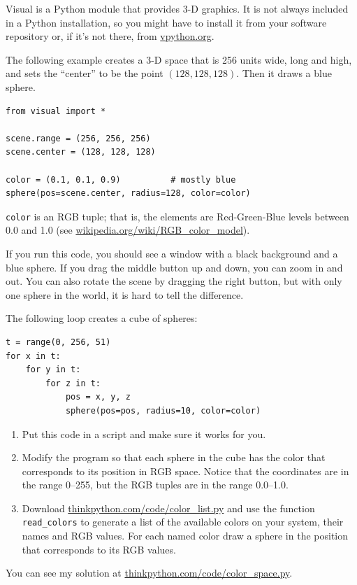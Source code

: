 \documentclass[10pt]{book}
\begin{document}
\begin{ex}


Visual is a Python module that provides 3-D graphics.  It is
not always included in a Python installation, so you might have
to install it from your software repository or, if it's not there,
from \url{vpython.org}.

The following example creates a 3-D space that is 256 units
wide, long and high, and sets the ``center'' to be the
point $(128, 128, 128)$.  Then it draws a blue sphere.

\beforeverb
\begin{verbatim}
from visual import *

scene.range = (256, 256, 256)
scene.center = (128, 128, 128)

color = (0.1, 0.1, 0.9)          # mostly blue
sphere(pos=scene.center, radius=128, color=color)
\end{verbatim}
\afterverb

{\tt color} is an RGB tuple; that is, the elements are Red-Green-Blue
levels between 0.0 and 1.0 (see
\url{wikipedia.org/wiki/RGB_color_model}).

If you run this code, you should see a window with a black
background and a blue sphere.  If you drag the middle button
up and down, you can zoom in and out.  You can also rotate
the scene by dragging the right button, but with only one
sphere in the world, it is hard to tell the difference.

The following loop creates a cube of spheres:

\beforeverb
\begin{verbatim}
t = range(0, 256, 51)
for x in t:
    for y in t:
        for z in t:
            pos = x, y, z
            sphere(pos=pos, radius=10, color=color)
\end{verbatim}
\afterverb

\begin{enumerate}

\item Put this code in a script and make sure it works for
you.

\item Modify the program so that each sphere in the cube
has the color that corresponds to its position in RGB space.
Notice that the coordinates are in the range 0--255, but
the RGB tuples are in the range 0.0--1.0.


\item Download \url{thinkpython.com/code/color_list.py}
and use the function \verb"read_colors" to generate a list
of the available colors on your system, their names and
RGB values.  For each named color draw a sphere in the
position that corresponds to its RGB values.



\end{enumerate}

You can see my solution at \url{thinkpython.com/code/color_space.py}.

\end{ex}
\end{document}
